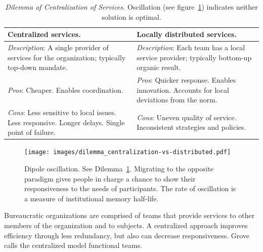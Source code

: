 

\begin{center}
\begin{table}[H] %
\begin{tabular}{ | m{\dilemmatablewidth}| m{\dilemmatablewidth} | } 
  \hline
  \textbf{Centralized services.} &
  \textbf{Locally distributed services.} \\
  \hline
  \textit{Description}: A single provider of services for the organization; typically top-down mandate. &
  \textit{Description}: Each team has a local service provider; typically bottom-up organic result. \\  
  \hline
  \textit{Pros}: Cheaper. Enables coordination. &
  \textit{Pros}: Quicker response. 
  Enables innovation. 
  Accounts for local deviations from the norm. \\
  \hline
  \textit{Cons}: Less sensitive to local issues. Less responsive. Longer delays. Single point of failure.  & 
  \textit{Cons}: Uneven quality of service. Inconsistent strategies and policies. \\
  \hline
\end{tabular}
\caption{
\textit{Dilemma of Centralization of Services.}
Oscillation (see figure~\ref{fig:central-vs-distributed}) indicates neither solution is optimal.
}
\label{table:central-vs-distributed}
\end{table}
\end{center}

\begin{figure}[H] %
    \centering
    \texttt{[image: images/dilemma\_centralization-vs-distributed.pdf]}
    \caption{Dipole oscillation. See Dilemma~\ref{table:central-vs-distributed}. Migrating to the opposite paradigm gives people in charge a chance to show their responsiveness to the needs of participants. The rate of oscillation is a measure of institutional memory half-life.}
    \label{fig:central-vs-distributed}
\end{figure}

Bureaucratic organizations are comprised of teams that provide services to other members of the organization and to subjects. A centralized approach improves efficiency through less redundancy, but also can decrease responsiveness.  
Grove~\cite{1995_Grove} calls the centralized model functional teams.

